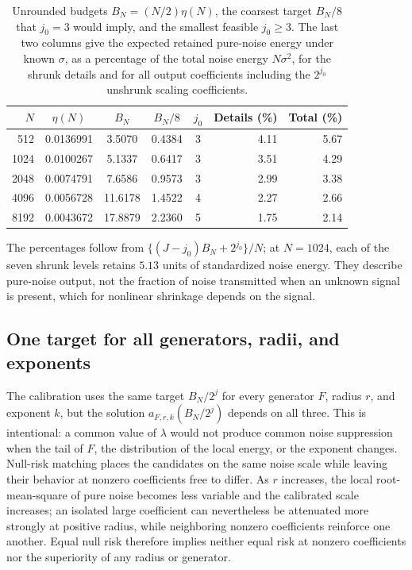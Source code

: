 \documentclass[11pt]{article}
\numberwithin{equation}{section}
\begin{document}
\begin{table}[H]
\centering\small
\caption{Unrounded budgets $B_N=(N/2)\eta(N)$, the coarsest target $B_N/8$ that $j_0=3$ would imply, and the smallest feasible $j_0\ge3$. The last two columns give the expected retained pure-noise energy under known $\sigma$, as a percentage of the total noise energy $N\sigma^2$, for the shrunk details and for all output coefficients including the $2^{j_0}$ unshrunk scaling coefficients.}
\label{tab:s4-budgets}
\setlength{\tabcolsep}{5pt}
\begin{tabular}{rccccrr}
\toprule
$N$ & $\eta(N)$ & $B_N$ & $B_N/8$ & $j_0$ & Details (\%) & Total (\%) \\
\midrule
512  & 0.0136991 & 3.5070  & 0.4384 & 3 & 4.11 & 5.67 \\
1024 & 0.0100267 & 5.1337  & 0.6417 & 3 & 3.51 & 4.29 \\
2048 & 0.0074791 & 7.6586  & 0.9573 & 3 & 2.99 & 3.38 \\
4096 & 0.0056728 & 11.6178 & 1.4522 & 4 & 2.27 & 2.66 \\
8192 & 0.0043672 & 17.8879 & 2.2360 & 5 & 1.75 & 2.14 \\
\bottomrule
\end{tabular}
\end{table}

\noindent
The percentages follow from $\{(J-j_0)B_N+2^{j_0}\}/N$; at $N=1024$, each of the seven shrunk levels retains $5.13$ units of standardized noise energy. They describe pure-noise output, not the fraction of noise transmitted when an unknown signal is present, which for nonlinear shrinkage depends on the signal.

\subsection{One target for all generators, radii, and exponents}
\label{sec:s4-common}
The calibration uses the same target $B_N/2^j$ for every generator $F$, radius $r$, and exponent $k$, but the solution $a_{F,r,k}(B_N/2^j)$ depends on all three. This is intentional: a common value of $\lambda$ would not produce common noise suppression when the tail of $F$, the distribution of the local energy, or the exponent changes. Null-risk matching places the candidates on the same noise scale while leaving their behavior at nonzero coefficients free to differ. As $r$ increases, the local root-mean-square of pure noise becomes less variable and the calibrated scale increases; an isolated large coefficient can nevertheless be attenuated more strongly at positive radius, while neighboring nonzero coefficients reinforce one another. Equal null risk therefore implies neither equal risk at nonzero coefficients nor the superiority of any radius or generator.
\end{document}
